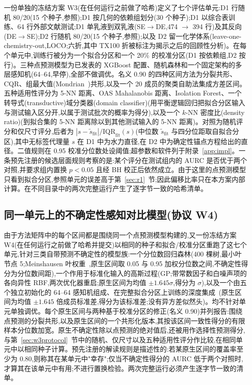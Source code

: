 \documentclass[11pt,a4paper]{ctexart}
\begin{document}
一份单独的冻结方案 W3(在任何运行之前做了哈希)定义了七个评估单元:D1 行随机 80/20(15 个种子,参照);D1 按几何的依赖组划分(30 个种子);D1 以综合表训练、64 行外部文献测试;D1 单乳液到双乳液(SE$\to$DE,474 $\to$ 394 行)及其反向(DE$\to$SE);D2 行随机 80/20(15 个种子,参照);以及 D2 留一化学体系(leave-one-chemistry-out,LOCO;六折,其中 TX100 折被标注为揭示之后的回顾性分析)。在每个单元中,训练行被分为一个拟合分区和一个 20\% 的校准分区(D1 按依赖组,D2 按行)。三种点预测模型为已发表的 XGBoost 配置、随机森林和一个固定架构的多层感知机(64–64,早停),全部不做调优。名义 0.90 的四种区间方法为分裂共形、CQR、组最大值(Mondrian~\cite{vovk2005})共形,以及一个 20 成员的聚类自助法集成方差区间。五种适用性评分为 5-NN 距离、OAS Mahalanobis 距离、Isolation Forest、一个转导式(transductive)域分类器(domain classifier)(用平衡逻辑回归把拟合分区输入与测试输入区分开,以属于测试批次的概率为得分),以及一个 $k$-NN 密度比(density ratio)(到拟合集的 5-NN 距离除以到其他测试输入的 5-NN 距离)。对照为随机评分和仅尺寸评分,后者为 $|s-\tilde{s}_{\mathrm{fit}}|/\mathrm{IQR}_{\mathrm{fit}}(s)$(中位数 $\tilde{s}_{\mathrm{fit}}$ 与四分位距取自拟合分区),其中无标签代理量 $s$ 在 D1 中为水力直径,在 D2 中为确定性锚点方程给出的直径。二值规则在 0.95 校准分位数处设阈值;超参数和软件列于附录~\ref{app:impl}。一条预先注册的候选层面规则考察的是:某个评分在测试组内的 AURC 是否优于两个对照,并要求组内置换 $p<0.05$ 且经 BH 校正后依然成立。由于这里的点预测模型只看到拟合分区,参照单元的误差高于第~\ref{sec:r1}~节;因此偏移比率只在本方案内部计算。在不同目录中的两次完整运行产生了逐字节一致的哈希清单。

\subsection{同一单元上的不确定性感知对比模型(协议 W4)}
\label{sec:w4protocol}

由于方法矩阵中的每个区间都是围绕同一个点预测模型构建的,又一份冻结方案 W4(在任何运行之前做了哈希并提交)以相同的种子和拟合/校准分区重跑了这七个单元,针对三类自带预测不确定性的模型族:一个分位数回归森林(400 棵树,最小叶节点 5;Meinshausen 叶权重~\cite{meinshausen2006},原生区间取 0.05 与 0.95 加权分位数之间,不确定性得分为分位数间距),一个作用于标准化输入的高斯过程(GP;带常数因子和白噪声项的各向异性 RBF,两次优化器重启;原生区间为均值 $\pm 1.645\sigma$,得分为 $\sigma$),以及一个由五个独立初始化的 64–64 感知机组成、在完整拟合分区上训练的深度集成~\cite{lakshminarayanan2017}(原生区间为均值 $\pm 1.645$ 倍成员标准差,得分为该标准差;没有异方差似然头)。均不针对单元单独调优。每个原生区间与两种基于校准分区的修正(名义 0.90)并列报告:围绕点预测的分裂共形,以及原生区间的一个共形化版本,其按该区间一致性得分的有限样本分位数加宽。原生不确定性除以点预测的绝对值后,还被用作选择性预测得分,与第~\ref{sec:w3protocol}~节中的随机、仅尺寸以及五种适用性评分作比较,在相同单元中以相同种子计算。预先注册的解读规则是描述性的:若某原生区间的覆盖率至少为 0.80,则称其在某单元中"幸存";仅当不确定性得分的 AURC 低于两个对照时,才算其在该单元中有用;不进行置换检验。两次完整运行必须产生逐字节一致的清单。
\end{document}
